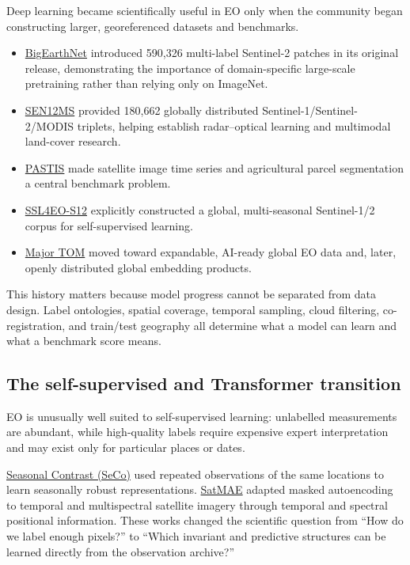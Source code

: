 \documentclass[
  a4paper,
  11pt]{article}
\providecommand{\tightlist}{%
  \setlength{\itemsep}{0pt}\setlength{\parskip}{0pt}}
\begin{document}
Deep learning became scientifically useful in EO only when the community
began constructing larger, georeferenced datasets and benchmarks.

\begin{itemize}
\tightlist
\item
  \href{https://arxiv.org/abs/1902.06148}{BigEarthNet} introduced
  590,326 multi-label Sentinel-2 patches in its original release,
  demonstrating the importance of domain-specific large-scale
  pretraining rather than relying only on ImageNet.
\item
  \href{https://arxiv.org/abs/1906.07789}{SEN12MS} provided 180,662
  globally distributed Sentinel-1/Sentinel-2/MODIS triplets, helping
  establish radar--optical learning and multimodal land-cover research.
\item
  \href{https://arxiv.org/abs/2107.07933}{PASTIS} made satellite image
  time series and agricultural parcel segmentation a central benchmark
  problem.
\item
  \href{https://arxiv.org/abs/2211.07044}{SSL4EO-S12} explicitly
  constructed a global, multi-seasonal Sentinel-1/2 corpus for
  self-supervised learning.
\item
  \href{https://arxiv.org/html/2402.12095v2}{Major TOM} moved toward
  expandable, AI-ready global EO data and, later, openly distributed
  global embedding products.
\end{itemize}

This history matters because model progress cannot be separated from
data design. Label ontologies, spatial coverage, temporal sampling,
cloud filtering, co-registration, and train/test geography all determine
what a model can learn and what a benchmark score means.

\hypertarget{the-self-supervised-and-transformer-transition}{%
\subsection{The self-supervised and Transformer
transition}\label{the-self-supervised-and-transformer-transition}}

EO is unusually well suited to self-supervised learning: unlabelled
measurements are abundant, while high-quality labels require expensive
expert interpretation and may exist only for particular places or dates.

\href{https://openaccess.thecvf.com/content/ICCV2021/papers/Manas_Seasonal_Contrast_Unsupervised_Pre-Training_From_Uncurated_Remote_Sensing_Data_ICCV_2021_paper.pdf}{Seasonal
Contrast (SeCo)} used repeated observations of the same locations to
learn seasonally robust representations.
\href{https://proceedings.neurips.cc/paper_files/paper/2022/hash/01c561df365429f33fcd7a7faa44c985-Abstract-Conference.html}{SatMAE}
adapted masked autoencoding to temporal and multispectral satellite
imagery through temporal and spectral positional information. These
works changed the scientific question from ``How do we label enough
pixels?'' to ``Which invariant and predictive structures can be learned
directly from the observation archive?''
\end{document}
